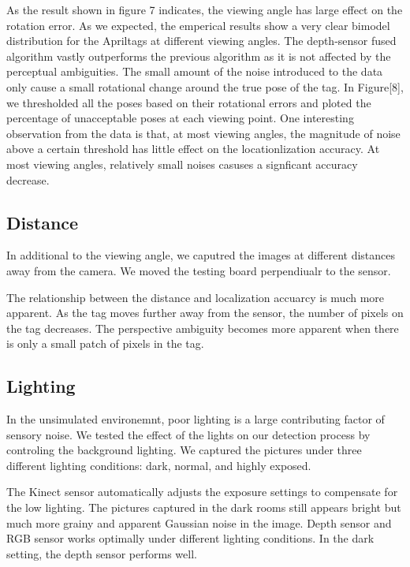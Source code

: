 As the result shown in figure 7 indicates, the viewing angle has large effect on the rotation error. As we expected, the emperical results show a very clear bimodel distribution for the Apriltags at different viewing angles. The depth-sensor fused algorithm vastly outperforms the previous algorithm as it is not affected by the perceptual ambiguities. The small amount of the noise introduced to the data only cause a small rotational change around the true pose of the tag. In Figure[8], we thresholded all the poses based on their rotational errors and ploted the percentage of unacceptable poses at each viewing point. One interesting observation from the data is that, at most viewing angles, the magnitude of noise above a certain threshold has little effect on the locationlization accuracy. At most viewing angles, relatively small noises casuses a signficant accuracy decrease. 
\subsection{Distance}
In additional to the viewing angle, we caputred the images at different distances away from the camera. We moved the testing board perpendiualr to the sensor. 

The relationship between the distance and localization accuarcy is much more apparent. As the tag moves further away from the sensor, the number of pixels on the tag decreases. The perspective ambiguity becomes more apparent when there is only a small patch of pixels in the tag. 
\subsection{Lighting}
In the unsimulated environemnt, poor lighting is a large contributing factor of sensory noise. We tested the effect of the lights on our detection process by controling the background lighting. We captured the pictures under three different lighting conditions: dark, normal, and highly exposed. 

The Kinect sensor automatically adjusts the exposure settings to compensate for the low lighting. The pictures captured in the dark rooms still appears bright but much more grainy and apparent Gaussian noise in the image. Depth sensor and RGB sensor works optimally under different lighting conditions. In the dark setting, the depth sensor performs well. 


